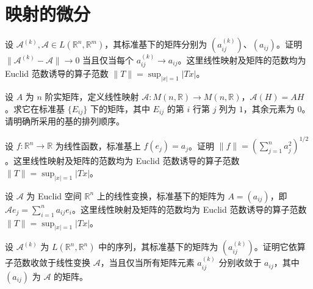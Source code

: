 \renewcommand{\thesection}{\arabic{section}}\renewcommand{\theHsection}{chapter.\arabic{section}}\setcounter{section}{16}\section{映射的微分}
\noindent\begin{minipage}{\textwidth}
设 $\mathcal A^{(k)},\mathcal A\in L(\mathbb R^n,\mathbb R^m)$，其标准基下的矩阵分别为 $(a_{ij}^{(k)})$、$(a_{ij})$。证明 $\|\mathcal A^{(k)}-\mathcal A\|\to0$ 当且仅当每个 $a_{ij}^{(k)}\to a_{ij}$。这里线性映射及矩阵的范数均为 Euclid 范数诱导的算子范数 $\|T\|=\sup_{|x|=1}|Tx|$。
\end{minipage}\par\vfill
\noindent\begin{minipage}{\textwidth}
设 $A$ 为 $n$ 阶实矩阵，定义线性映射 $\mathcal A:M(n,\mathbb R)\to M(n,\mathbb R)$，$\mathcal A(H)=AH$。求它在标准基 $\{E_{ij}\}$ 下的矩阵，其中 $E_{ij}$ 的第 $i$ 行第 $j$ 列为 $1$，其余元素为 $0$。请明确所采用的基的排列顺序。
\end{minipage}\par\vfill
\noindent\begin{minipage}{\textwidth}
设 $f:\mathbb R^n\to\mathbb R$ 为线性函数，标准基上 $f(e_j)=a_j$。证明 $\|f\|=(\sum_{j=1}^n a_j^2)^{1/2}$。这里线性映射及矩阵的范数均为 Euclid 范数诱导的算子范数 $\|T\|=\sup_{|x|=1}|Tx|$。
\end{minipage}\par\vfill
\noindent\begin{minipage}{\textwidth}
设 $\mathcal A$ 为 Euclid 空间 $\mathbb R^n$ 上的线性变换，标准基下的矩阵为 $A=(a_{ij})$，即 $\mathcal Ae_j=\sum_{i=1}^n a_{ij}e_i$。这里线性映射及矩阵的范数均为 Euclid 范数诱导的算子范数 $\|T\|=\sup_{|x|=1}|Tx|$。
\end{minipage}\par\vfill
\newpage
\noindent\begin{minipage}{\textwidth}
设 $\mathcal A^{(k)}$ 为 $L(\mathbb R^n,\mathbb R^n)$ 中的序列，其标准基下的矩阵为 $(a_{ij}^{(k)})$。证明它依算子范数收敛于线性变换 $\mathcal A$，当且仅当所有矩阵元素 $a_{ij}^{(k)}$ 分别收敛于 $a_{ij}$，其中 $(a_{ij})$ 为 $\mathcal A$ 的矩阵。
\end{minipage}\par\vfill
